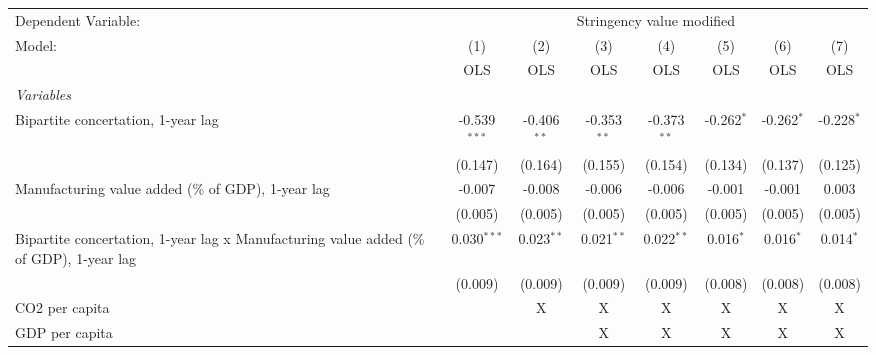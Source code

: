 
\begingroup
\centering
\begin{tabular}{lccccccc}
   \toprule
   Dependent Variable: & \multicolumn{7}{c}{Stringency value modified}\\
   Model:                                                                                  & (1)            & (2)           & (3)           & (4)           & (5)          & (6)          & (7)\\  
                                                                                           &  OLS           & OLS           & OLS           & OLS           & OLS          & OLS          & OLS\\  
   \midrule
   \emph{Variables}\\
   Bipartite concertation, 1-year lag                                                      & -0.539$^{***}$ & -0.406$^{**}$ & -0.353$^{**}$ & -0.373$^{**}$ & -0.262$^{*}$ & -0.262$^{*}$ & -0.228$^{*}$\\   
                                                                                           & (0.147)        & (0.164)       & (0.155)       & (0.154)       & (0.134)      & (0.137)      & (0.125)\\   
   Manufacturing value added (\% of GDP), 1-year lag                                       & -0.007         & -0.008        & -0.006        & -0.006        & -0.001       & -0.001       & 0.003\\   
                                                                                           & (0.005)        & (0.005)       & (0.005)       & (0.005)       & (0.005)      & (0.005)      & (0.005)\\   
   Bipartite concertation, 1-year lag x Manufacturing value added (\% of GDP), 1-year lag  & 0.030$^{***}$  & 0.023$^{**}$  & 0.021$^{**}$  & 0.022$^{**}$  & 0.016$^{*}$  & 0.016$^{*}$  & 0.014$^{*}$\\   
                                                                                           & (0.009)        & (0.009)       & (0.009)       & (0.009)       & (0.008)      & (0.008)      & (0.008)\\   
   CO2 per capita                                                                          &                & X             & X             & X             & X            & X            & X\\  
   GDP per capita                                                                          &                &               & X             & X             & X            & X            & X\\  

\end{tabular}
